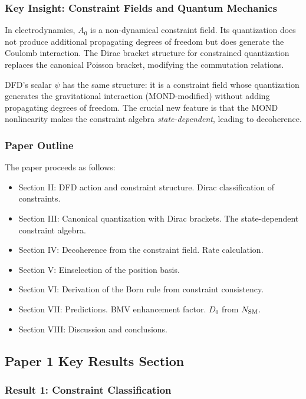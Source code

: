 \documentclass[11pt,a4paper]{article}
\begin{document}
\subsubsection{Key Insight: Constraint Fields and Quantum Mechanics}

In electrodynamics, $A_0$ is a non-dynamical constraint field. Its quantization does not produce additional propagating degrees of freedom but does generate the Coulomb interaction. The Dirac bracket structure for constrained quantization replaces the canonical Poisson bracket, modifying the commutation relations.

DFD's scalar $\psi$ has the same structure: it is a constraint field whose quantization generates the gravitational interaction (MOND-modified) without adding propagating degrees of freedom. The crucial new feature is that the MOND nonlinearity makes the constraint algebra \emph{state-dependent}, leading to decoherence.

\subsubsection{Paper Outline}

The paper proceeds as follows:
\begin{itemize}
\item Section II: DFD action and constraint structure. Dirac classification of constraints.
\item Section III: Canonical quantization with Dirac brackets. The state-dependent constraint algebra.
\item Section IV: Decoherence from the constraint field. Rate calculation.
\item Section V: Einselection of the position basis.
\item Section VI: Derivation of the Born rule from constraint consistency.
\item Section VII: Predictions. BMV enhancement factor. $D_0$ from $N_{\rm SM}$.
\item Section VIII: Discussion and conclusions.
\end{itemize}

\subsection{Paper 1 Key Results Section}

\subsubsection{Result 1: Constraint Classification}
\end{document}
